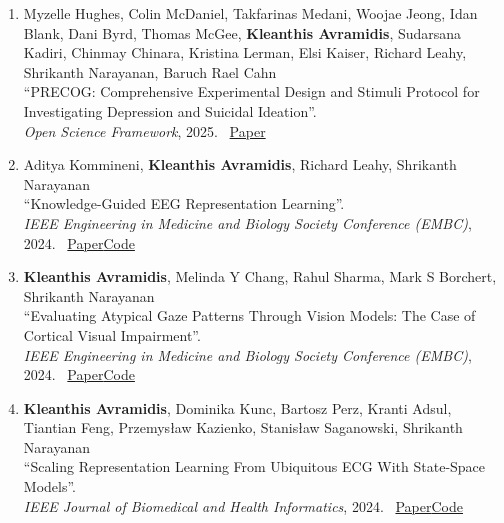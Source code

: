 \documentclass[margin]{res}
\begin{document}
\begin{resume}
\begin{enumerate}[leftmargin=*,itemsep=3pt]
\item \begin{minipage}[t]{\linewidth}\raggedright
    Myzelle Hughes, Colin McDaniel, Takfarinas Medani, Woojae Jeong, Idan Blank, Dani Byrd, Thomas McGee, \textbf{Kleanthis Avramidis}, Sudarsana Kadiri, Chinmay Chinara, Kristina Lerman, Elsi Kaiser, Richard Leahy, Shrikanth Narayanan, Baruch Rael Cahn \\
    ``PRECOG: Comprehensive Experimental Design and Stimuli Protocol for Investigating Depression and Suicidal Ideation''. \\
    \textit{Open Science Framework}, 2025. \ \href{https://osf.io/preprints/osf/nxvz5\_v1}{Paper}
\end{minipage}

\item \begin{minipage}[t]{\linewidth}\raggedright
    Aditya Kommineni, \textbf{Kleanthis Avramidis}, Richard Leahy, Shrikanth Narayanan \\
    ``Knowledge-Guided EEG Representation Learning''. \\
    \textit{IEEE Engineering in Medicine and Biology Society Conference (EMBC)}, 2024. \ \href{https://ieeexplore.ieee.org/abstract/document/10782310/}{Paper}\enspace \href{https://github.com/Uncertain-Quark/s4\_eeg}{Code}
\end{minipage}

\item \begin{minipage}[t]{\linewidth}\raggedright
    \textbf{Kleanthis Avramidis}, Melinda Y Chang, Rahul Sharma, Mark S Borchert, Shrikanth Narayanan \\
    ``Evaluating Atypical Gaze Patterns Through Vision Models: The Case of Cortical Visual Impairment''. \\
    \textit{IEEE Engineering in Medicine and Biology Society Conference (EMBC)}, 2024. \ \href{https://ieeexplore.ieee.org/abstract/document/10782199/}{Paper}\enspace \href{https://github.com/klean2050/cvi-eye-tracking}{Code}
\end{minipage}

\newpage
\item \begin{minipage}[t]{\linewidth}\raggedright
    \textbf{Kleanthis Avramidis}, Dominika Kunc, Bartosz Perz, Kranti Adsul, Tiantian Feng, Przemys\l{}aw Kazienko, Stanis\l{}aw Saganowski, Shrikanth Narayanan \\
    ``Scaling Representation Learning From Ubiquitous ECG With State-Space Models''. \\
    \textit{IEEE Journal of Biomedical and Health Informatics}, 2024. \ \href{https://ieeexplore.ieee.org/abstract/document/10574308/}{Paper}\enspace \href{https://github.com/klean2050/tiles\_ecg\_model}{Code}
\end{minipage}


\end{enumerate}
\end{resume}
\end{document}
